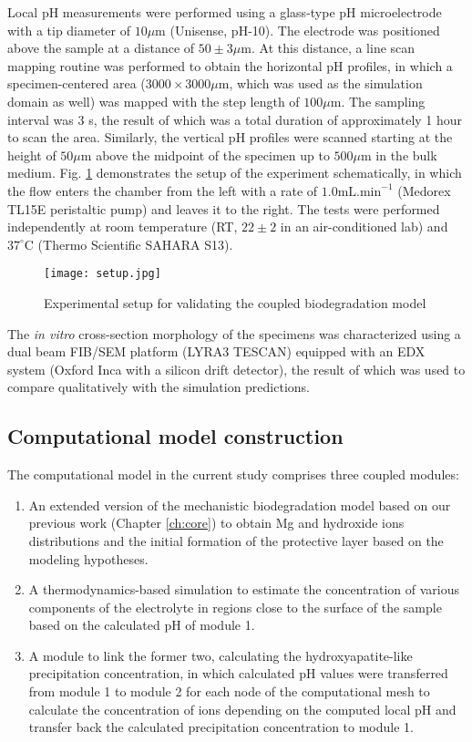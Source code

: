 Local pH measurements were performed using a glass-type pH microelectrode with a tip diameter of $10\mu\text{m}$ (Unisense, pH-10). The electrode was positioned above the sample at a distance of $50\pm3\mu\text{m}$. At this distance, a line scan mapping routine was performed to obtain the horizontal pH profiles, in which a specimen-centered area ($3000 \times 3000 \mu\text{m}$, which was used as the simulation domain as well) was mapped with the step length of $100\mu\text{m}$. The sampling interval was 3 s, the result of which was a total duration of approximately 1 hour to scan the area. Similarly, the vertical pH profiles were scanned starting at the height of $50\mu\text{m}$ above the midpoint of the specimen up to $500\mu\text{m}$ in the bulk medium. Fig. \ref{fig:kinetics_setup} demonstrates the setup of the experiment schematically, in which the flow enters the chamber from the left with a rate of $1.0\text{mL.min}^{-1}$ (Medorex TL15E peristaltic pump) and leaves it to the right. The tests were performed independently at room temperature ({RT}, $22 \pm 2$ in an air-conditioned lab) and $37^{\circ}\text{C}$ (Thermo Scientific SAHARA S13).


\begin{figure}[h]
\centering
\medskip
\texttt{[image: setup.jpg]}
\caption[Experimental setup for validating the coupled biodegradation model]{Experimental setup for validating the coupled biodegradation model} \label{fig:kinetics_setup}
\end{figure}

The \textit{in vitro} cross-section morphology of the specimens was characterized using a dual beam {FIB}/{SEM} platform (LYRA3 TESCAN) equipped with an {EDX} system (Oxford Inca with a silicon drift detector), the result of which was used to compare qualitatively with the simulation predictions.

\subsection{Computational model construction} \label{sec:kinetics_model}

The computational model in the current study comprises three coupled modules:
\begin{enumerate}
\item
An extended version of the mechanistic biodegradation model based on our previous work \cite{Barzegari2021} (Chapter \ref{ch:core}) to obtain Mg and hydroxide ions distributions and the initial formation of the protective layer based on the modeling hypotheses.
\item
A thermodynamics-based simulation to estimate the concentration of various components of the electrolyte in regions close to the surface of the sample based on the calculated pH of module 1.
\item
A module to link the former two, calculating the hydroxyapatite-like precipitation concentration, in which calculated pH values were transferred from module 1 to module 2 for each node of the computational mesh to calculate the concentration of ions depending on the computed local pH and transfer back the calculated precipitation concentration to module 1.
\end{enumerate}

